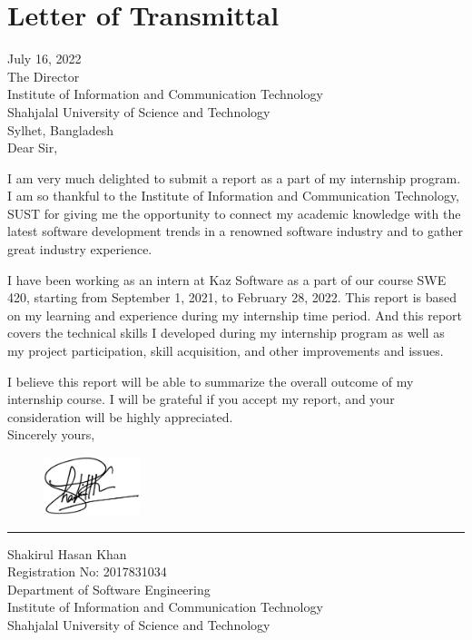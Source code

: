 \chapter*{Letter of Transmittal}

July 16, 2022\\
The Director\\
Institute of Information and Communication Technology\\
Shahjalal University of Science and Technology\\
Sylhet, Bangladesh\\

Dear Sir,

I am very much delighted to submit a report as a part of my internship program.
I am so thankful to the Institute of Information and Communication Technology, SUST for giving me the opportunity to connect my academic knowledge with the latest software development trends in a renowned software industry and to gather great industry experience.

I have been working as an intern at Kaz Software as a part of our course SWE 420, starting from September 1, 2021, to February 28, 2022.
This report is based on my learning and experience during my internship time period. And this report covers the technical skills I developed during my internship program as well as my project participation, skill acquisition, and other improvements and issues.

I believe this report will be able to summarize the overall outcome of my internship course.
I will be grateful if you accept my report, and your consideration will be highly appreciated.\\

Sincerely yours,
\begin{figure}[h]
    \includegraphics[width= 0.25\textwidth]{images/LetterOfTransmittal/mySignCropped.jpg}  
    \label{fig:mySign}
\end{figure}
\hrule height 0.4pt width 120pt
\vspace*{15pt}
Shakirul Hasan Khan\\
Registration No: 2017831034\\
Department of Software Engineering\\
Institute of Information and Communication Technology\\
Shahjalal University of Science and Technology